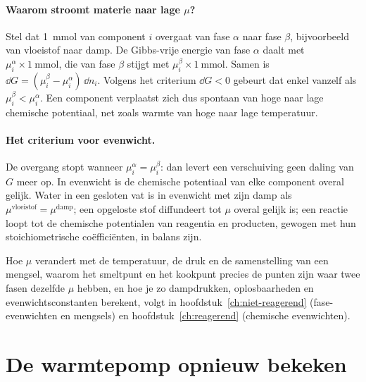 \paragraph{Waarom stroomt materie naar lage $\mu$?} Stel dat \SI{1}{\milli\mole} van component $i$ overgaat van fase $\alpha$ naar fase $\beta$, bijvoorbeeld van vloeistof naar damp. De Gibbs-vrije energie van fase $\alpha$ daalt met $\mu_i^\alpha \times \SI{1}{\milli\mole}$, die van fase $\beta$ stijgt met $\mu_i^\beta \times \SI{1}{\milli\mole}$. Samen is $\dd G = (\mu_i^\beta - \mu_i^\alpha)\,\dd n_i$. Volgens het criterium $\dd G < 0$ gebeurt dat enkel vanzelf als $\mu_i^\beta < \mu_i^\alpha$. Een component verplaatst zich dus spontaan van hoge naar lage chemische potentiaal, net zoals warmte van hoge naar lage temperatuur.

\paragraph{Het criterium voor evenwicht.} De overgang stopt wanneer $\mu_i^\alpha = \mu_i^\beta$: dan levert een verschuiving geen daling van $G$ meer op. In evenwicht is de chemische potentiaal van elke component overal gelijk. Water in een gesloten vat is in evenwicht met zijn damp als $\mu^\text{vloeistof} = \mu^\text{damp}$; een opgeloste stof diffundeert tot $\mu$ overal gelijk is; een reactie loopt tot de chemische potentialen van reagentia en producten, gewogen met hun stoichiometrische co\"effici\"enten, in balans zijn.

Hoe $\mu$ verandert met de temperatuur, de druk en de samenstelling van een mengsel, waarom het smeltpunt en het kookpunt precies de punten zijn waar twee fasen dezelfde $\mu$ hebben, en hoe je zo dampdrukken, oplosbaarheden en evenwichtsconstanten berekent, volgt in hoofdstuk~\ref{ch:niet-reagerend} (fase-evenwichten en mengsels) en hoofdstuk~\ref{ch:reagerend} (chemische evenwichten).

\section{De warmtepomp opnieuw bekeken}

